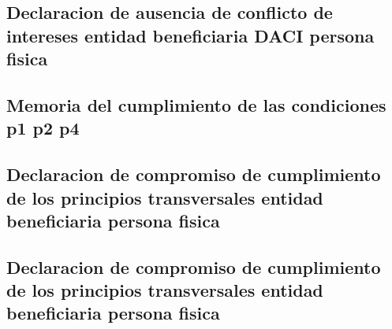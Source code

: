 \documentclass{article}
\begin{document}
\subsection{Declaracion de ausencia de conflicto de intereses entidad beneficiaria DACI persona fisica}



\subsection{Memoria del cumplimiento de las condiciones p1 p2 p4}



\subsection{Declaracion de compromiso de cumplimiento de los principios transversales entidad beneficiaria persona fisica}



\subsection{Declaracion de compromiso de cumplimiento de los principios transversales entidad beneficiaria persona fisica}

\end{document}
